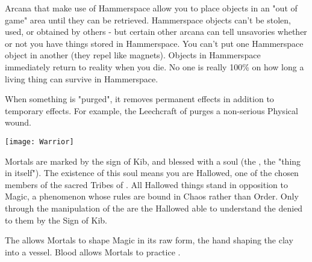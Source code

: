 {\begin{multicols}{2}
 \newpage


  Arcana that make use of Hammerspace allow you to place objects in an "out of game" area until they can be retrieved.  Hammerspace objects can't be stolen, used, or obtained by others - but certain other arcana can tell unsavories whether or not you have things stored in Hammerspace.  You can't put one Hammerspace object in another (they repel like magnets). Objects in Hammerspace immediately return to reality when you die.  No one is really 100\% on how long a living thing can survive in Hammerspace.  

\cbreak

  
  When something is "purged", it removes permanent effects in addition to temporary effects.  For example, the Leechcraft of  purges a non-serious Physical wound.  

  \begin{center}
  \texttt{[image: Warrior]}
  \end{center}


  \newpage


  Mortals are marked by the sign of Kib, and blessed with a soul (the , the "thing in itself").  The existence of this soul means you are Hallowed, one of the chosen members of the sacred Tribes of \TheAuthority.  All Hallowed things stand in opposition to Magic, a phenomenon whose rules are bound in Chaos rather than Order. Only through the manipulation of the  are the Hallowed able to understand the  denied to them by the Sign of Kib.



  The  allows Mortals to shape Magic in its raw form, the hand shaping the clay into a vessel. Blood allows Mortals to practice .



\end{multicols}}
